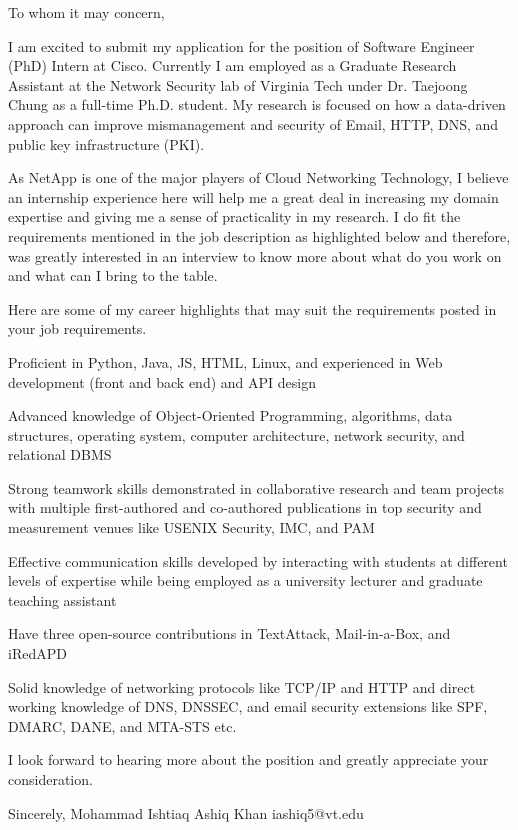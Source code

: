 To whom it may concern,

I am excited to submit my application for the position of Software Engineer (PhD) Intern at Cisco. Currently I am employed as a Graduate Research Assistant at the Network Security lab of Virginia Tech under Dr. Taejoong Chung as a full-time Ph.D. student. My research is focused on how a data-driven approach can improve mismanagement and security of Email, HTTP, DNS, and public key infrastructure (PKI).


As NetApp is one of the major players of Cloud Networking Technology, I believe an internship experience here will help me a great deal in increasing my domain expertise and giving me a sense of practicality in my research. I do fit the requirements mentioned in the job description as highlighted below and therefore, was greatly interested in an interview to know more about what do you work on and what can I bring to the table.  

Here are some of my career highlights that may suit the requirements posted in your job requirements.

Proficient in Python, Java, JS, HTML, Linux, and experienced in Web development (front and back end) and API design

Advanced knowledge of Object-Oriented Programming, algorithms, data structures, operating system, computer architecture, network security, and relational DBMS

Strong teamwork skills demonstrated in collaborative research and team projects with multiple first-authored and co-authored publications in top security and measurement venues like USENIX Security, IMC, and PAM

Effective communication skills developed by interacting with students at different levels of expertise while being employed as a university lecturer and graduate teaching assistant

Have three open-source contributions in TextAttack, Mail-in-a-Box, and iRedAPD

Solid knowledge of networking protocols like TCP/IP and HTTP and direct working knowledge of DNS, DNSSEC, and email security extensions like SPF, DMARC, DANE, and MTA-STS etc.


I look forward to hearing more about the position and greatly appreciate your consideration.

Sincerely,
Mohammad Ishtiaq Ashiq Khan
iashiq5@vt.edu